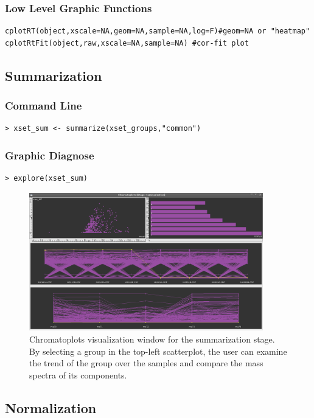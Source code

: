 \documentclass[11pt,a4paper]{article}
\begin{document}
\subsubsection*{Low Level Graphic Functions}
\begin{verbatim}
cplotRT(object,xscale=NA,geom=NA,sample=NA,log=F)#geom=NA or "heatmap"
cplotRtFit(object,raw,xscale=NA,sample=NA) #cor-fit plot
\end{verbatim}


\newpage
\subsection{Summarization}
\subsubsection*{Command Line}
\begin{verbatim}
> xset_sum <- summarize(xset_groups,"common")
\end{verbatim}

\subsubsection*{Graphic Diagnose}
\begin{verbatim}
> explore(xset_sum)
\end{verbatim}
\begin{figure}[h!t!b!p]
\begin{center}
  \includegraphics[width=4in]{sum.png}
  \caption{\label{fig:findpeaks}Chromatoplots visualization window for
  the summarization stage. By selecting a group in the top-left
  scatterplot, the user can examine the trend of the group over the
  samples and compare the mass spectra of its components.}
\end{center}
\end{figure}

\subsection{Normalization}
\end{document}
